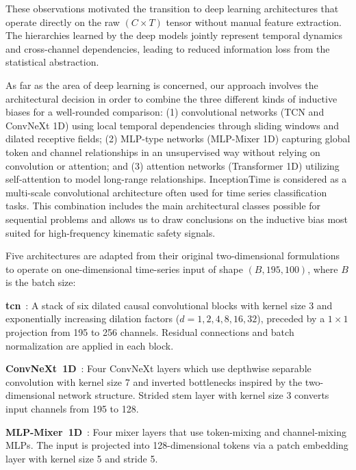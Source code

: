 \documentclass[3p,times,procedia]{elsarticle}
\begin{document}
These observations motivated the transition to deep learning architectures that operate directly on the raw $(C \times T)$ tensor without manual feature extraction. The hierarchies learned by the deep models jointly represent temporal dynamics and cross-channel dependencies, leading to reduced information loss from the statistical abstraction.

As far as the area of deep learning is concerned, our approach involves the architectural decision in order to combine the three different kinds of inductive biases for a well-rounded comparison: (1) convolutional networks (TCN and ConvNeXt 1D) using local temporal dependencies through sliding windows and dilated receptive fields; (2) MLP-type networks (MLP-Mixer 1D) capturing global token and channel relationships in an unsupervised way without relying on convolution or attention; and (3) attention networks (Transformer 1D) utilizing self-attention to model long-range relationships. InceptionTime is considered as a multi-scale convolutional architecture often used for time series classification tasks. This combination includes the main architectural classes possible for sequential problems and allows us to draw conclusions on the inductive bias most suited for high-frequency kinematic safety signals.

Five architectures are adapted from their original two-dimensional formulations to operate on one-dimensional time-series input of shape $(B, 195, 100)$, where $B$ is the batch size:

\textbf{\ac{tcn}}~\cite{bai2020tcn}: A stack of six dilated causal convolutional blocks with kernel size 3 and exponentially increasing dilation factors ($d = 1, 2, 4, 8, 16, 32$), preceded by a $1{\times}1$ projection from 195 to 256 channels. Residual connections and batch normalization are applied in each block.

\textbf{ConvNeXt~1D}~\cite{liu2022convnext}: Four ConvNeXt layers which use depthwise separable convolution with kernel size 7 and inverted bottlenecks inspired by the two-dimensional network structure. Strided stem layer with kernel size 3 converts input channels from 195 to 128.

\textbf{MLP-Mixer~1D}~\cite{tolstikhin2021mlpmixer}: Four mixer layers that use token-mixing and channel-mixing MLPs. The input is projected into 128-dimensional tokens via a patch embedding layer with kernel size 5 and stride 5.
\end{document}
